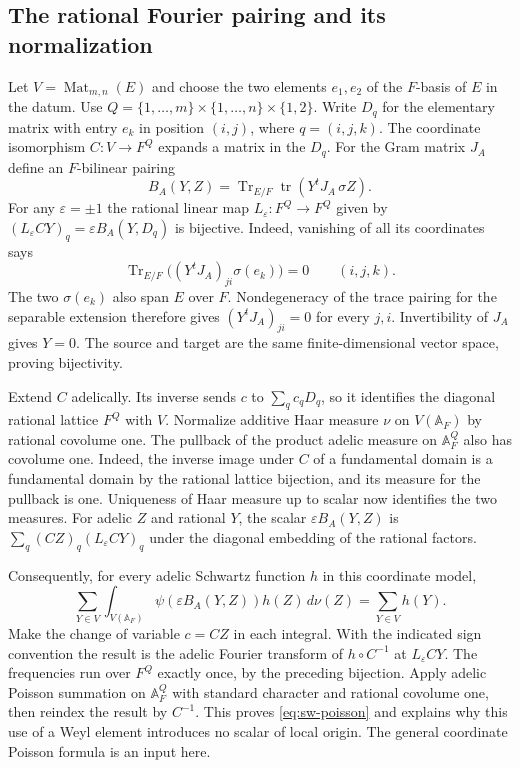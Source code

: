 \subsection{The rational Fourier pairing and its normalization}

Let \(V=\operatorname{Mat}_{m,n}(E)\) and choose the two elements
\(e_1,e_2\) of the \(F\)-basis of \(E\) in the datum. Use
\(Q=\{1,\ldots,m\}\times\{1,\ldots,n\}\times\{1,2\}\).
Write \(D_q\) for the elementary matrix with entry \(e_k\) in
position \((i,j)\), where \(q=(i,j,k)\). The coordinate isomorphism
\(C\colon V\to F^Q\) expands a matrix in the \(D_q\). For the
Gram matrix \(J_A\) define an \(F\)-bilinear pairing
\[
 B_A(Y,Z)=\operatorname{Tr}_{E/F}
              \operatorname{tr}(Y^t J_A\,\sigma Z).
\]
For any \(\varepsilon=\pm1\) the rational linear map
\(L_\varepsilon\colon F^Q\to F^Q\) given by
\((L_\varepsilon C Y)_q=\varepsilon B_A(Y,D_q)\) is bijective.
Indeed, vanishing of all its coordinates says
\[
 \operatorname{Tr}_{E/F}\bigl((Y^tJ_A)_{ji}\sigma(e_k)\bigr)=0
                         \qquad(i,j,k).
\]
The two \(\sigma(e_k)\) also span \(E\) over \(F\).
Nondegeneracy of the trace pairing for the separable extension
therefore gives \((Y^tJ_A)_{ji}=0\) for every \(j,i\).
Invertibility of \(J_A\) gives \(Y=0\). The source and target are
the same finite-dimensional vector space, proving bijectivity.

Extend \(C\) adelically. Its inverse sends \(c\) to
\(\sum_q c_q D_q\), so it identifies the diagonal rational
lattice \(F^Q\) with \(V\). Normalize additive Haar measure
\(\nu\) on \(V(\mathbb A_F)\) by rational covolume one.
The pullback of the product adelic measure on \(\mathbb A_F^Q\)
also has covolume one. Indeed, the inverse image under \(C\) of
a fundamental domain is a fundamental domain by the rational
lattice bijection, and its measure for the pullback is one.
Uniqueness of Haar measure up to scalar now identifies the two
measures. For adelic \(Z\) and rational \(Y\), the scalar
\(\varepsilon B_A(Y,Z)\) is \(\sum_q (CZ)_q(L_\varepsilon C Y)_q\)
under the diagonal embedding of the rational factors.

Consequently, for every adelic Schwartz function \(h\) in this
coordinate model,
\begin{equation}
 \sum_{Y\in V}\int_{V(\mathbb A_F)}
        \psi(\varepsilon B_A(Y,Z))h(Z)\,d\nu(Z)
       =\sum_{Y\in V}h(Y).
 \label{eq:sw-poisson}
\end{equation}
Make the change of variable \(c=CZ\) in each integral. With the
indicated sign convention the result is the adelic Fourier
transform of \(h\circ C^{-1}\) at \(L_\varepsilon C Y\).
The frequencies run over \(F^Q\) exactly once, by the preceding
bijection. Apply adelic Poisson summation on \(\mathbb A_F^Q\)
with standard character and rational covolume one, then reindex the
result by \(C^{-1}\). This proves \eqref{eq:sw-poisson} and explains
why this use of a Weyl element introduces no scalar of local origin.
The general coordinate Poisson formula is an input here.

